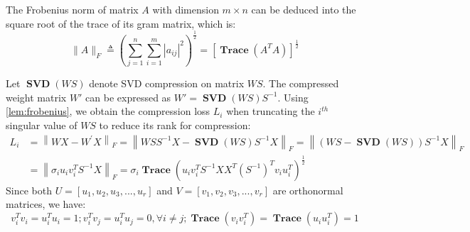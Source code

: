 \vspace{0mm}
\begin{lemma}
\label{lem:frobenius}
    The Frobenius norm of matrix $A$ with dimension $m\times n$ can be deduced into the square root of the trace of its gram matrix, which is: 
        \begin{equation}
        \|A\|_F \triangleq\left(\sum_{j=1}^n \sum_{i=1}^m\left|a_{i j}\right|^2\right)^{\frac{1}{2}} =\left[\boldsymbol{\operatorname{Trace}}\left(A^T A\right)\right]^{\frac{1}{2}}
        \end{equation}
\end{lemma}
Let $\boldsymbol{\operatorname{SVD}}(WS)$ denote SVD compression on matrix $WS$. The compressed weight matrix $W'$ can be expressed as $W' = \boldsymbol{\operatorname{SVD}}(WS)S^{-1}$. Using \cref{lem:frobenius}, we obtain the compression loss $L_i$ when truncating the $i^{th}$ singular value of $WS$ to reduce its rank for compression:
\begin{equation}
\label{formula:loss}
    \begin{split}
    L_i&=\left\|W X-W^{\prime} X\right\|_F=\left\|W S S^{-1} X-\boldsymbol{\operatorname{SVD}}(W S) S^{-1} X\right\|_F=\left\|(W S-\boldsymbol{\operatorname{SVD}}(W S)) S^{-1} X\right\|_F\\
    &=\left\|\sigma_i u_i v_i^T S^{-1} X\right\|_F=\sigma_i \boldsymbol{\operatorname{Trace}}\left(u_i v_i^T S^{-1} X X^T\left(S^{-1}\right)^T v_i u_i^T\right)^{\frac{1}{2}}
    \end{split}
\end{equation}
Since both $U=[u_1,u_2,u_3,...,u_r]$ and $V=[v_1,v_2,v_3,...,v_r]$ are orthonormal matrices, we have:
\begin{equation}
v_i^T v_i = u_i^T u_i = 1; v_i^T v_j = u_i^T u_j = 0, \forall i \neq j ; \boldsymbol{\operatorname{Trace}}(v_i v_i^T) = \boldsymbol{\operatorname{Trace}}(u_i u_i^T) =1
\end{equation}

